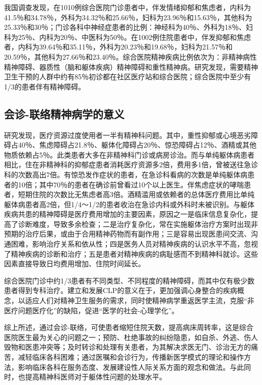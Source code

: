 我国调查发现，在1010例综合医院门诊患者中，伴发情绪抑郁和焦虑者，内科为41.5％和34.78％，外科为34.32％和25.66％，妇科为23.96％和15.63％，其他科为25.33％和30％；门诊各科中神经症患者的比例：神经科为40％、外科为18％、妇科为25％、内科为20％、中医科为50％。在1002例住院患者中，伴发抑郁和焦虑者，内科为39.64％和35.11％，外科为20.23％和19.68％，妇科为21.57％和20.59％，其他科为27.66％和23.40％。综合医院精神疾病比例依次为：非精神病性精神障碍、器质性（脑和躯体疾病）精神障碍和重性精神病。研究发现，需要精神卫生干预的人群中约有85％初诊都在社区医疗站和综合医院；综合医院中至少有1/3的患者伴有精神障碍。

\subsection{会诊-联络精神病学的意义}

研究发现，医疗资源过度使用者一半有精神科问题。其中，重性抑郁或心境恶劣障碍占40％、焦虑障碍占21.8％、躯体化障碍占20％、惊恐障碍占12％、酒精或其他物质依赖占5％。此类患者大多在非精神科门诊或病房诊治。而与单纯躯体病患者相比，住在非精神科的抑郁症患者消耗医疗资源多2倍，费用多1倍，曾被送往急诊科的次数高出7倍。有惊恐发作症状的患者，在急诊科看病的次数是单纯躯体病患者的10倍；其中70％的患者在确诊前曾看过10个以上医生。伴焦虑症状的哮喘患者，短期住院的次数比无焦虑者高3倍。酒精滥用或依赖者的总体医疗费用比单纯躯体病患者高2倍，但1/4～1/2的患者收治在急诊内科或外科时未被识别。与躯体疾病共患的精神障碍是医疗费用增加的主要因素，原因之一是临床信息复杂化，提高了诊断难度，导致多余检查；二是治疗复杂化，常在实施躯体治疗方案时出现非预期的治疗后果，或由于合用精神药物而有副作用；三是容易出现医患间交流、沟通困难，影响治疗关系和依从性；四是医务人员对精神疾病的认识水平不高，忽视了精神疾病的诊断和治疗；五是患者对精神疾病的病耻感而不到精神科就诊。这些因素直接导致日均费用增加、住院时间延长。

综合医院门诊中约1/3患者有不同类型、不同程度的精神障碍，而其中仅有极少数患者得到专科治疗。建立和发展CLP的意义在于，更加强调心身整合的疾病概念，以适应人们对精神卫生服务的需求，同时使精神病学重返医学主流，克服“非医疗问题医疗化”的缺陷，促进“医学的社会-心理学化”。

综上所述，通过会诊-联络，可使患者缩短住院天数，提高病床周转率，这是综合医院医生最为关心的问题之一；预防、杜绝事故的纠纷隐患，如自杀、外逃、伤人毁物和医患冲突等；及时转诊和处理有关患者，为其解决求医无门、诊治无方的痛苦，减轻临床各科困难；通过医嘱和会诊行为，传播新医学模式的理论和操作方法，影响临床各科在服务态度、发展建设性人际关系方面的观念和做法。与此同时，也提高精神科医师对于躯体性问题的处理水平。

